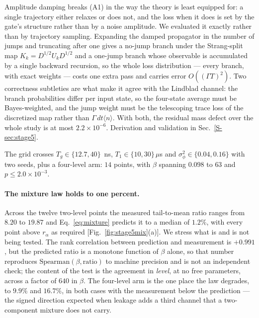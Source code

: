 \documentclass[aps,pra,twocolumn,superscriptaddress,reprint,nofootinbib,floatfix]{revtex4-2}
\theoremstyle{definition}
\newcommand{\sref}[1]{Sec.~\ref{S-#1}}
\begin{document}
Amplitude damping breaks (A1) in the way the theory is least equipped for: a
single trajectory either relaxes or does not, and the loss when it does is
set by the gate's structure rather than by a noise amplitude. We evaluated it
exactly rather than by trajectory sampling. Expanding the damped propagator
in the number of jumps and truncating after one gives a no-jump branch under
the Strang-split map $K_k=D^{1/2}U_kD^{1/2}$ and a one-jump branch whose
observable is accumulated by a single backward recursion, so the whole loss
distribution --- every branch, with exact weights --- costs one extra pass and
carries error $O((\Gamma T)^2)$. Two correctness subtleties are what make it
agree with the Lindblad channel: the branch probabilities differ per input
state, so the four-state average must be Bayes-weighted, and the jump weight
must be the telescoping trace loss of the discretized map rather than
$\Gamma\,dt\langle n\rangle$. With both, the residual mass defect over the
whole study is at most $2.2\times10^{-6}$. Derivation and validation in
\sref{sec:stage5}.

The grid crosses $T_g\in\{12.7,40\}$~ns, $T_1\in\{10,30\}\,\mu$s and
$\sigma_\phi^2\in\{0.04,0.16\}$ with two seeds, plus a four-level arm:
$14$ points, with $\beta$ spanning $0.098$ to $63$ and $p\le2.0\times10^{-3}$.

\paragraph*{The mixture law holds to one percent.} Across the twelve
two-level points the measured tail-to-mean ratio ranges from $8.20$ to
$19.87$ and Eq.~\eqref{eq:mixture} predicts it to a median of $1.2\%$, with
every point above $r_\alpha$ as required [Fig.~\ref{fig:stage5mix}(a)]. We
stress what is and is not being tested. The rank correlation between
prediction and measurement is $+0.991$, but the predicted ratio is a monotone
function of $\beta$ alone, so that number reproduces
$\mathrm{Spearman}(\beta,\text{ratio})$ to machine precision and is not an
independent check; the content of the test is the agreement in \emph{level},
at no free parameters, across a factor of $640$ in $\beta$. The four-level arm
is the one place the law degrades, to $9.9\%$ and $16.7\%$, in both cases with
the measurement below the prediction --- the signed direction expected when
leakage adds a third channel that a two-component mixture does not carry.
\end{document}
